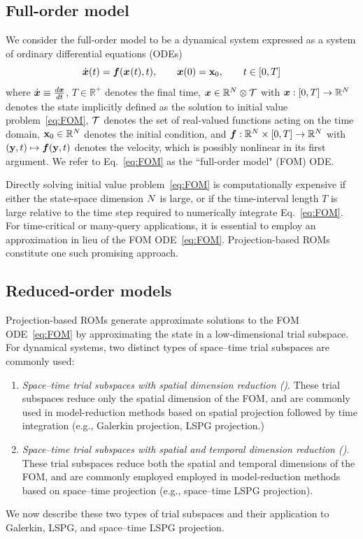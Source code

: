\documentclass[3p,computermodern,10pt]{elsarticle}
\begin{document}
	\subsection{Full-order model}\label{sec;FOM}
We consider the full-order model to be a dynamical system expressed as a
	system of ordinary differential equations (ODEs)
\begin{equation}\label{eq:FOM}
 \dot{{\boldsymbol x}}(t)  = \boldsymbol f({\boldsymbol x}^{}(t),t), \qquad {\boldsymbol x}(0) =
	{{\mathbf{x}}_0},\qquad t \in [0,T]
\end{equation}
where $\dot{{\boldsymbol x}} \equiv \frac{d {\boldsymbol x}}{dt}$, 
$T \in \mathbb{R}^+$ denotes the final time, ${\boldsymbol x} \in \mathbb{R}^{N}
	\otimes \mathcal{T} $ with ${\boldsymbol x}: [0,T] \rightarrow  \mathbb{R}^{N}$
	denotes the state implicitly defined as the solution to initial value
	problem~\eqref{eq:FOM}, 
	$\mathcal{T}$ denotes the set of real-valued functions acting on the time
	domain, 
 ${{\mathbf{x}}_0} \in \mathbb{R}^{N}$ denotes the initial condition,
	and $\boldsymbol f: \mathbb{R}^{N} \times [0,T] \rightarrow
	\mathbb{R}^{N}$ with $(\mathbf{y},t) \mapsto
	\boldsymbol f(\mathbf{y},t)$ denotes the velocity, which is possibly
	nonlinear in its first argument. We refer to Eq.~\eqref{eq:FOM} 
	as the ``full-order model" (FOM) ODE.

Directly solving initial value problem~\eqref{eq:FOM} is computationally
	expensive if either the state-space dimension $N$ is large, or if the
	time-interval length $T$ is large relative to the time step required to
	numerically integrate Eq.~\eqref{eq:FOM}. For time-critical or many-query
	applications, it is essential to employ an approximation in lieu of the FOM
	ODE~\eqref{eq:FOM}. Projection-based ROMs constitute one such promising
	approach. 

\subsection{Reduced-order models}
Projection-based ROMs generate approximate solutions to the FOM
	ODE~\eqref{eq:FOM} by approximating the state in a low-dimensional trial
	subspace. For dynamical 
	systems, two distinct types of space--time trial subspaces are commonly used: 
\begin{enumerate} 
	\item \textit{Space–time trial subspaces with spatial dimension reduction (\spatialAcronym)}. These 
	trial subspaces reduce only the spatial dimension of the FOM, and are commonly used
		in model-reduction methods based on spatial projection followed by time
		integration (e.g., Galerkin projection, LSPG projection.)
	\item \textit{Space–time trial subspaces with spatial and temporal dimension reduction (\spaceTimeAcronym)}. These 
	trial subspaces reduce both the spatial and temporal dimensions of the FOM,
		and are commonly employed 
		employed in model-reduction methods based on space--time projection (e.g.,
		space--time LSPG projection).
\end{enumerate}
 We now describe these two types of trial subspaces and their application to 
	Galerkin, LSPG, and space--time LSPG projection. 
\end{document}
